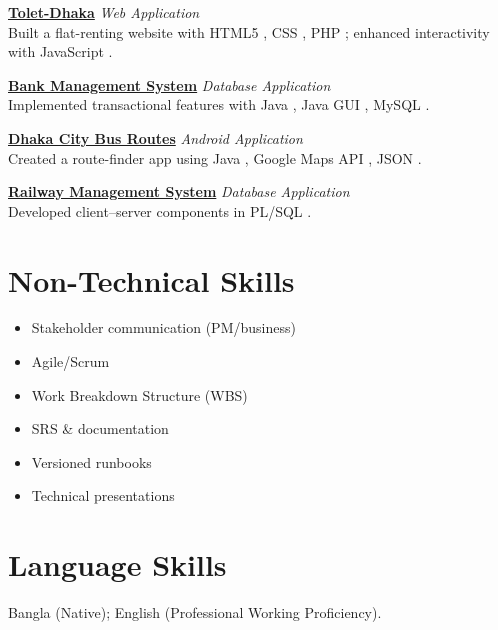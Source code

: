 \documentclass[10pt,letterpaper]{article}
\newcommand{\pill}[1]{%
  \begingroup\setlength{\fboxsep}{1.2pt}%
  \colorbox{brandblue!12}{\textcolor{brandblue}{\scriptsize #1}}%
  \endgroup
}
\begin{document}
\textbf{\href{https://github.com/Mehedi-Hasan-Abir/Tolet-Dhaka}{Tolet-Dhaka}}  \textbar{} \textit{Web Application} \\
Built a flat-renting website with \pill{HTML5}, \pill{CSS}, \pill{PHP}; enhanced interactivity with \pill{JavaScript}. \medskip

\textbf{\href{https://github.com/Mehedi-Hasan-Abir/Bank-Management-Sysytem}{Bank Management System}}  \textbar{} \textit{Database Application} \\
Implemented transactional features with \pill{Java}, \pill{Java GUI}, \pill{MySQL}. \medskip

\textbf{\href{https://github.com/Mehedi-Hasan-Abir/-Dhaka-City-Bus-Routes-}{Dhaka City Bus Routes}}  \textbar{} \textit{Android Application} \\
Created a route-finder app using \pill{Java}, \pill{Google Maps API}, \pill{JSON}. \medskip

\textbf{\href{https://github.com/Mehedi-Hasan-Abir/Railway-Station-Management-System}{Railway Management System}}  \textbar{} \textit{Database Application} \\
Developed client–server components in \pill{PL/SQL}.

\section{Non-Technical Skills}
\begin{itemize}[leftmargin=1.5em]
  \item Stakeholder communication (PM/business)
  \item Agile/Scrum
  \item Work Breakdown Structure (WBS)
  \item SRS \& documentation
  \item Versioned runbooks
  \item Technical presentations
\end{itemize}

\section{Language Skills}
Bangla (Native); English (Professional Working Proficiency).
\end{document}
